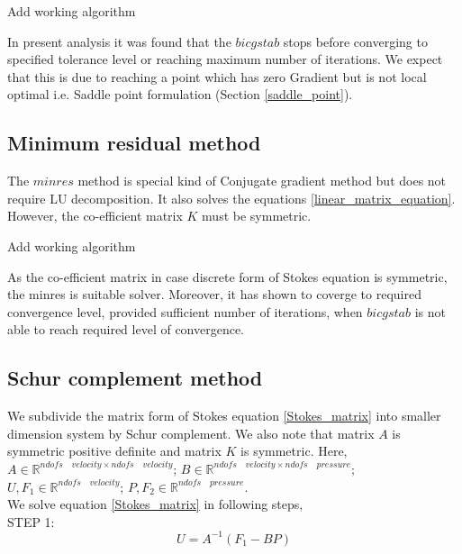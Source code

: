 \documentclass[a4paper,12pt]{book}
\begin{document}
\begin{Huge}
Add working algorithm
\end{Huge}

In present analysis it was found that the $bicgstab$ stops before converging to specified tolerance level or reaching maximum number of iterations. We expect that this is due to reaching a point which has zero Gradient but is not local optimal i.e. Saddle point formulation (Section \ref{saddle_point}). 

\subsection{Minimum residual method} 

The $minres$ method is special kind of Conjugate gradient method but does not require LU decomposition. It also solves the equations \ref{linear_matrix_equation}. However, the co-efficient matrix $K$ must be symmetric. 

\begin{Huge}
Add working algorithm
\end{Huge}

As the co-efficient matrix in case discrete form of Stokes equation is symmetric, the minres is suitable solver. Moreover, it has shown to coverge to required convergence level, provided sufficient number of iterations, when $bicgstab$ is not able to reach required level of convergence.

\subsection{Schur complement method} \cite{Fritzen} \label{schur}

We subdivide the matrix form of Stokes equation \eqref{Stokes_matrix} into smaller dimension system by Schur complement. We also note that matrix $A$ is symmetric positive definite and matrix $K$ is symmetric.
Here, $A \in \mathbb{R}^{ndofs\quad velocity \times ndofs \quad velocity}$; $B \in \mathbb{R}^{ndofs \quad velocity \times ndofs \quad pressure}$; $U,F_1 \in \mathbb{R}^{ndofs \quad velocity}$; $P, F_2 \in \mathbb{R}^{ndofs \quad pressure}$. \\

We solve equation \eqref{Stokes_matrix} in following steps,\\

STEP 1: \\ 
\begin{equation}\label{schur step 1}
U = A^{-1}(F_1 - BP) 
\end{equation}
\end{document}
